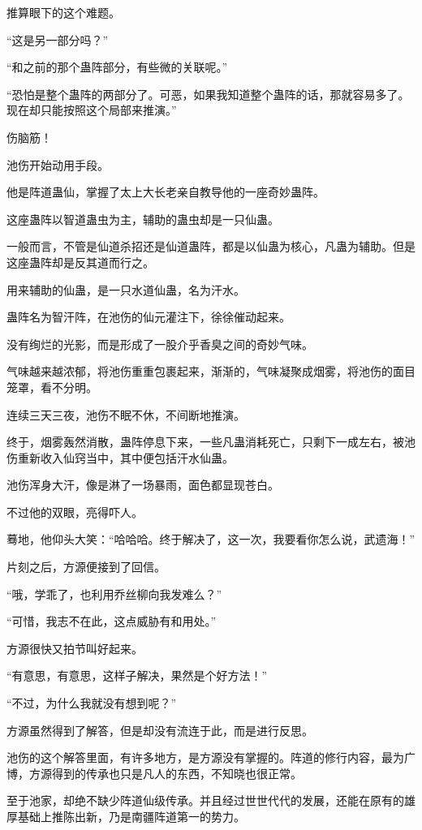 \begin{this_body}
推算眼下的这个难题。

“这是另一部分吗？”

“和之前的那个蛊阵部分，有些微的关联呢。”

“恐怕是整个蛊阵的两部分了。可恶，如果我知道整个蛊阵的话，那就容易多了。现在却只能按照这个局部来推演。”

伤脑筋！

池伤开始动用手段。

他是阵道蛊仙，掌握了太上大长老亲自教导他的一座奇妙蛊阵。

这座蛊阵以智道蛊虫为主，辅助的蛊虫却是一只仙蛊。

一般而言，不管是仙道杀招还是仙道蛊阵，都是以仙蛊为核心，凡蛊为辅助。但是这座蛊阵却是反其道而行之。

用来辅助的仙蛊，是一只水道仙蛊，名为汗水。

蛊阵名为智汗阵，在池伤的仙元灌注下，徐徐催动起来。

没有绚烂的光影，而是形成了一股介乎香臭之间的奇妙气味。

气味越来越浓郁，将池伤重重包裹起来，渐渐的，气味凝聚成烟雾，将池伤的面目笼罩，看不分明。

连续三天三夜，池伤不眠不休，不间断地推演。

终于，烟雾轰然消散，蛊阵停息下来，一些凡蛊消耗死亡，只剩下一成左右，被池伤重新收入仙窍当中，其中便包括汗水仙蛊。

池伤浑身大汗，像是淋了一场暴雨，面色都显现苍白。

不过他的双眼，亮得吓人。

蓦地，他仰头大笑：“哈哈哈。终于解决了，这一次，我要看你怎么说，武遗海！”

片刻之后，方源便接到了回信。

“哦，学乖了，也利用乔丝柳向我发难么？”

“可惜，我志不在此，这点威胁有和用处。”

方源很快又拍节叫好起来。

“有意思，有意思，这样子解决，果然是个好方法！”

“不过，为什么我就没有想到呢？”

方源虽然得到了解答，但是却没有流连于此，而是进行反思。

池伤的这个解答里面，有许多地方，是方源没有掌握的。阵道的修行内容，最为广博，方源得到的传承也只是凡人的东西，不知晓也很正常。

至于池家，却绝不缺少阵道仙级传承。并且经过世世代代的发展，还能在原有的雄厚基础上推陈出新，乃是南疆阵道第一的势力。


\end{this_body}
